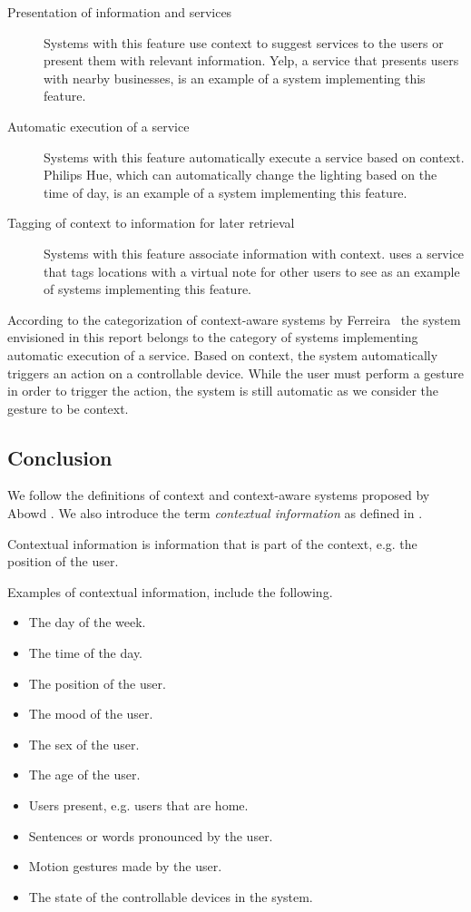\begin{description}
\item[Presentation of information and services] Systems with this feature use context to suggest services to the users or present them with relevant information. Yelp, a service that presents users with nearby businesses, is an example of a system implementing this feature.
\item[Automatic execution of a service] Systems with this feature automatically execute a service based on context. Philips Hue, which can automatically change the lighting based on the time of day, is an example of a system implementing this feature.
\item[Tagging of context to information for later retrieval] Systems with this feature associate information with context. \cite{ferreira2014distributed} uses a service that tags locations with a virtual note for other users to see as an example of systems implementing this feature.
\end{description}

According to the categorization of context-aware systems by Ferreira \etal~the system envisioned in this report belongs to the category of systems implementing automatic execution of a service. Based on context, the system automatically triggers an action on a controllable device. While the user must perform a gesture in order to trigger the action, the system is still automatic as we consider the gesture to be context.

\subsection{Conclusion}

We follow the definitions of context and context-aware systems proposed by Abowd \etal. We also introduce the term \emph{contextual information} as defined in . 

\begin{definition}
\label{def:contextual-information}
Contextual information is information that is part of the context, e.g. the position of the user.
\end{definition}

Examples of contextual information, include the following.

\begin{itemize}
\item The day of the week.
\item The time of the day.
\item The position of the user.
\item The mood of the user.
\item The sex of the user.
\item The age of the user.
\item Users present, e.g. users that are home.
\item Sentences or words pronounced by the user.
\item Motion gestures made by the user.
\item The state of the controllable devices in the system.
\end{itemize}

